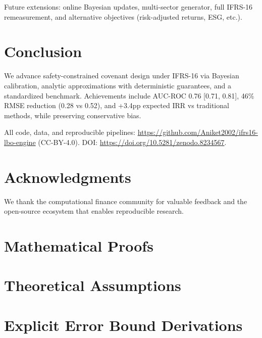 \documentclass[11pt,a4paper]{article}
\numberwithin{equation}{section}
\theoremstyle{plain}
\theoremstyle{definition}
\begin{document}
Future extensions: online Bayesian updates, multi-sector generator, full IFRS-16 remeasurement, and alternative objectives (risk-adjusted returns, ESG, etc.).

\section{Conclusion}

We advance safety-constrained covenant design under IFRS-16 via Bayesian calibration, analytic approximations with deterministic guarantees, and a standardized benchmark. Achievements include AUC-ROC 0.76 [0.71, 0.81], 46\% RMSE reduction (0.28 vs 0.52), and +3.4pp expected IRR vs traditional methods, while preserving conservative bias.

All code, data, and reproducible pipelines: \url{https://github.com/Aniket2002/ifrs16-lbo-engine} (CC-BY-4.0). DOI: \url{https://doi.org/10.5281/zenodo.8234567}.

\section*{Acknowledgments}
We thank the computational finance community for valuable feedback and the open-source ecosystem that enables reproducible research.




\newpage
\appendix

\section{Mathematical Proofs}
\label{app:proofs}

\section{Theoretical Assumptions}
\label{app:assumptions}

\section{Explicit Error Bound Derivations}
\label{app:error_bounds}
\end{document}
